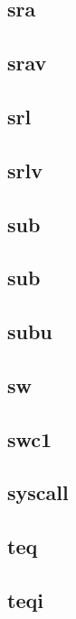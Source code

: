 \subsection*{sra}

\subsection*{srav}

\subsection*{srl}

\subsection*{srlv}

\subsection*{sub}

\subsection*{sub}

\subsection*{subu}

\subsection*{sw}

\subsection*{swc1}

\subsection*{syscall}

\subsection*{teq}

\subsection*{teqi}

